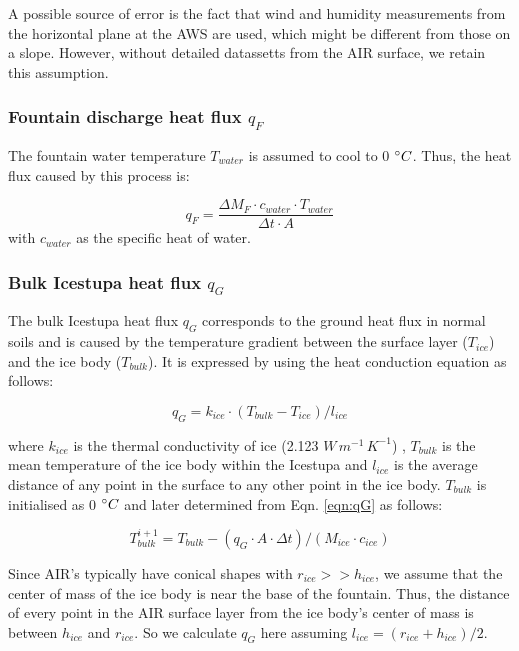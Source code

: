 \documentclass[utf8]{frontiersSCNS} %
\begin{document}
A possible source of error is the fact that wind and humidity measurements from the horizontal plane at the AWS are
used, which might be different from those on a slope. However, without detailed datassetts from the AIR surface, we
retain this assumption.

\subsubsection{Fountain discharge heat flux \texorpdfstring{$q_{F}$}{Lg} }
The fountain water temperature $T_{water}$ is assumed to cool to 0 $\degree C$. Thus, the heat flux caused by this
process is:

\begin{equation} 
    q_{F} = \frac{ \Delta M_F \cdot c_{water} \cdot T_{water}}{\Delta t \cdot A}
    \label{eqn:qF}
\end{equation} 
with $c_{water}$ as the specific heat of water. 

\subsubsection{Bulk Icestupa heat flux \texorpdfstring{$q_{G}$}{Lg}} \label{sec:Bulkflux}
The bulk Icestupa heat flux $q_{G}$ corresponds to the ground heat flux in normal soils and is caused by the temperature
gradient between the surface layer ($T_{ice}$) and the ice body ($T_{bulk}$). It is expressed by using the heat
conduction equation as follows:

\begin{equation} q_{G} = k_{ice} \cdot (T_{bulk}-T_{ice})/l_{ice} \label{eqn:qG}    \end{equation}

where $k_{ice}$ is the thermal conductivity of ice (2.123 $W\, m^{-1}\,K^{-1}$) , $T_{bulk}$ is the mean temperature of
the ice body within the Icestupa and $l_{ice}$ is the average distance of any point in the surface to any other point in
the ice body. $T_{bulk}$ is initialised as 0 $\degree C$ and later determined from Eqn. \ref{eqn:qG} as follows:

\begin{equation} T_{bulk}^{i+1} = T_{bulk} - (q_{G} \cdot A \cdot \Delta t)/(M_{ice} \cdot c_{ice}) \end{equation}

Since AIR's typically have conical shapes with $r_{ice} >> h_{ice}$, we assume that the center of mass of the ice body
is near the base of the fountain. Thus, the distance of every point in the AIR surface layer from the ice body's center
of mass is between $h_{ice}$ and $r_{ice}$. So we calculate $q_{G}$ here assuming $l_{ice} = (r_{ice} + h_{ice})/2$. 
\end{document}
